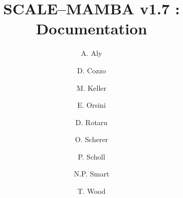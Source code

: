 \documentclass{article}
\begin{document}
\newcommand{\mainsection}[1]{\newpage \section{#1}}
\newcommand{\msubsection}[1]{\newpage \subsection{#1}}
\newcommand{\msubsubsection}[1]{\subsubsection{#1}}

\title{SCALE--MAMBA v1.7 : Documentation}
\author{
A. Aly
\and D. Cozzo
\and M. Keller 
\and E. Orsini
\and D. Rotaru 
\and O. Scherer
\and P. Scholl 
\and N.P. Smart
\and T. Wood}

\maketitle

\tableofcontents





























\end{document}
